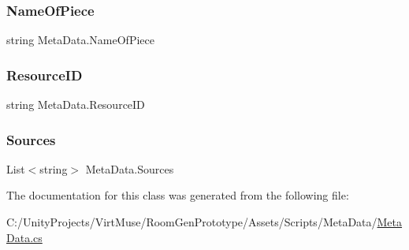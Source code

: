 \subsubsection{\texorpdfstring{Name\+Of\+Piece}{NameOfPiece}}
{\footnotesize\ttfamily string Meta\+Data.\+Name\+Of\+Piece}

\mbox{\label{class_meta_data_a1bbd18efe27fdbeb0ee920414caa12c8}} 
\subsubsection{\texorpdfstring{Resource\+ID}{ResourceID}}
{\footnotesize\ttfamily string Meta\+Data.\+Resource\+ID}

\mbox{\label{class_meta_data_acb76cf00c140a3da86a35ff350d0c05f}} 
\subsubsection{\texorpdfstring{Sources}{Sources}}
{\footnotesize\ttfamily List$<$string$>$ Meta\+Data.\+Sources}



The documentation for this class was generated from the following file\+:\begin{DoxyCompactItemize}
\item 
C\+:/\+Unity\+Projects/\+Virt\+Muse/\+Room\+Gen\+Prototype/\+Assets/\+Scripts/\+Meta\+Data/\mbox{\hyperlink{_meta_data_8cs}{Meta\+Data.\+cs}}\end{DoxyCompactItemize}
